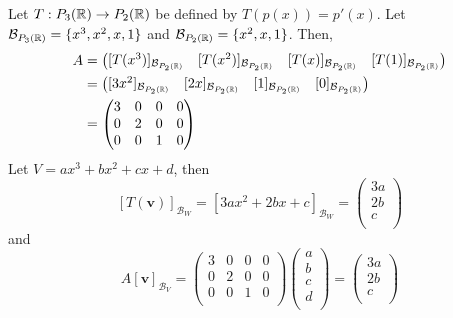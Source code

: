 \documentclass{article}
\begin{document}
\begin{example}
  Let $T: P_3(\mathbb{R}) \to P_2(\mathbb{R})$ be defined by $T(p(x)) = p'(x)$. Let $\mathcal{B}_{P_3(\mathbb{R})} = \{x^3, x^2, x, 1\}$ and $\mathcal{B}_{P_2(\mathbb{R})} = \{x^2, x, 1\}$. Then,
  \begin{align*}
    A & =
    \begin{pmatrix}
      [T(x^3)]_{\mathcal{B}_{P_2(\mathbb{R})}} & [T(x^2)]_{\mathcal{B}_{P_2(\mathbb{R})}} & [T(x)]_{\mathcal{B}_{P_2(\mathbb{R})}} & [T(1)]_{\mathcal{B}_{P_2(\mathbb{R})}}
    \end{pmatrix} \\
      & =
    \begin{pmatrix}
      [3x^2]_{\mathcal{B}_{P_2(\mathbb{R})}} & [2x]_{\mathcal{B}_{P_2(\mathbb{R})}} & [1]_{\mathcal{B}_{P_2(\mathbb{R})}} & [0]_{\mathcal{B}_{P_2(\mathbb{R})}} \\
    \end{pmatrix}            \\
      & =
    \begin{pmatrix}
      3 & 0 & 0 & 0 \\
      0 & 2 & 0 & 0 \\
      0 & 0 & 1 & 0 \\
    \end{pmatrix}
  \end{align*}
  Let $V = ax^3 + bx^2 + cx + d$, then \[[T(\textbf{v})]_{\mathcal{B}_W} = [3ax^2 + 2bx + c]_{\mathcal{B}_W} =
    \begin{pmatrix}
      3a \\2b\\c\\
    \end{pmatrix}\] and \[A[\textbf{v}]_{\mathcal{B}_V} =
    \begin{pmatrix}
      3 & 0 & 0 & 0 \\
      0 & 2 & 0 & 0 \\
      0 & 0 & 1 & 0 \\
    \end{pmatrix}
    \begin{pmatrix}
      a \\b\\c\\d\\
    \end{pmatrix} =
    \begin{pmatrix}
      3a \\2b\\c\\
    \end{pmatrix}\]
\end{example}
\end{document}
